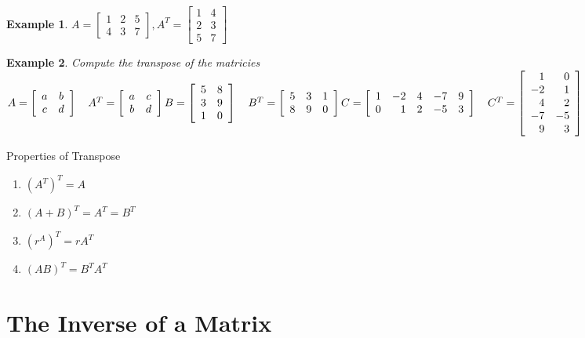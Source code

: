 \documentclass[a4paper,12pt,openany]{book}
\theoremstyle{defn}
\theoremstyle{expl}
\newtheorem{expl}{Example}[section]
\begin{document}
\begin{expl}
$A=\left[\begin{array}{ccc}1&2&5\\4&3&7\end{array}\right], A^T=\left[\begin{array}{cc}1&4\\2&3\\5&7\end{array}\right]$
\end{expl}
\begin{expl}\textup{Compute the transpose of the matricies\\}
$A=\left[\begin{array}{cc}a&b\\c&d\end{array}\right]\quad A^T = \left[\begin{array}{cc}a&c\\b&d\end{array}\right]\\
B=\left[\begin{array}{cc}5&8\\3&9\\1&0\end{array}\right]  \quad B^T=\left[\begin{array}{ccc}5&3&1\\8&9&0\end{array}\right] \\
C=\left[\begin{array}{crccc}1&-2&4&-7&9\\0&1&2&-5&3\end{array}\right]  \quad C^T=\left[\begin{array}{rr}1&0\\-2&1\\4&2\\-7&-5\\9&3\end{array}\right]$
\end{expl}
\noindent Properties of Transpose
\begin{multicols}{2}
\begin{enumerate}
\item $(A^T)^T=A$
\item $(A+B)^T=A^T=B^T$
\item $(r^A)^T=rA^T$
\item $(AB)^T=B^TA^T$
\end{enumerate}
\end{multicols}
\section{The Inverse of a Matrix}
\end{document}
